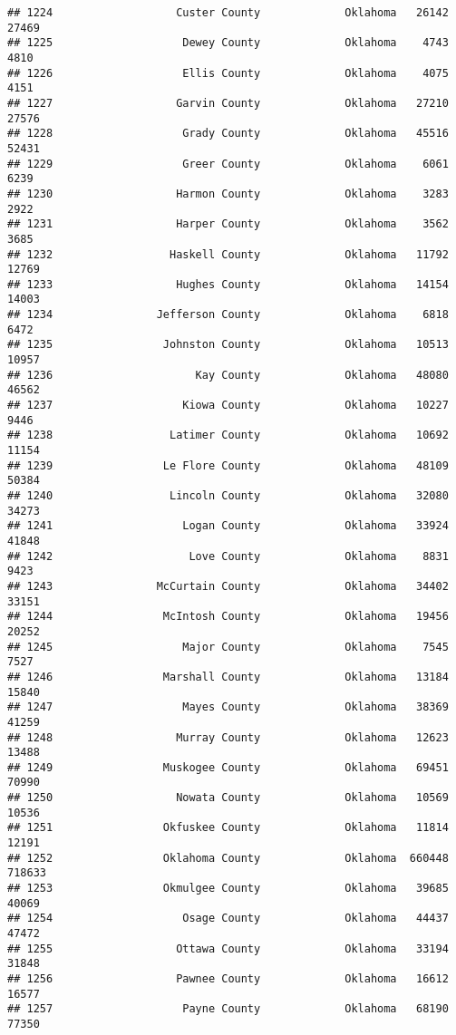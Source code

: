 \documentclass[
]{article}
\begin{document}
\begin{verbatim}
## 1224                   Custer County             Oklahoma   26142   27469
## 1225                    Dewey County             Oklahoma    4743    4810
## 1226                    Ellis County             Oklahoma    4075    4151
## 1227                   Garvin County             Oklahoma   27210   27576
## 1228                    Grady County             Oklahoma   45516   52431
## 1229                    Greer County             Oklahoma    6061    6239
## 1230                   Harmon County             Oklahoma    3283    2922
## 1231                   Harper County             Oklahoma    3562    3685
## 1232                  Haskell County             Oklahoma   11792   12769
## 1233                   Hughes County             Oklahoma   14154   14003
## 1234                Jefferson County             Oklahoma    6818    6472
## 1235                 Johnston County             Oklahoma   10513   10957
## 1236                      Kay County             Oklahoma   48080   46562
## 1237                    Kiowa County             Oklahoma   10227    9446
## 1238                  Latimer County             Oklahoma   10692   11154
## 1239                 Le Flore County             Oklahoma   48109   50384
## 1240                  Lincoln County             Oklahoma   32080   34273
## 1241                    Logan County             Oklahoma   33924   41848
## 1242                     Love County             Oklahoma    8831    9423
## 1243                McCurtain County             Oklahoma   34402   33151
## 1244                 McIntosh County             Oklahoma   19456   20252
## 1245                    Major County             Oklahoma    7545    7527
## 1246                 Marshall County             Oklahoma   13184   15840
## 1247                    Mayes County             Oklahoma   38369   41259
## 1248                   Murray County             Oklahoma   12623   13488
## 1249                 Muskogee County             Oklahoma   69451   70990
## 1250                   Nowata County             Oklahoma   10569   10536
## 1251                 Okfuskee County             Oklahoma   11814   12191
## 1252                 Oklahoma County             Oklahoma  660448  718633
## 1253                 Okmulgee County             Oklahoma   39685   40069
## 1254                    Osage County             Oklahoma   44437   47472
## 1255                   Ottawa County             Oklahoma   33194   31848
## 1256                   Pawnee County             Oklahoma   16612   16577
## 1257                    Payne County             Oklahoma   68190   77350

\end{verbatim}
\end{document}
